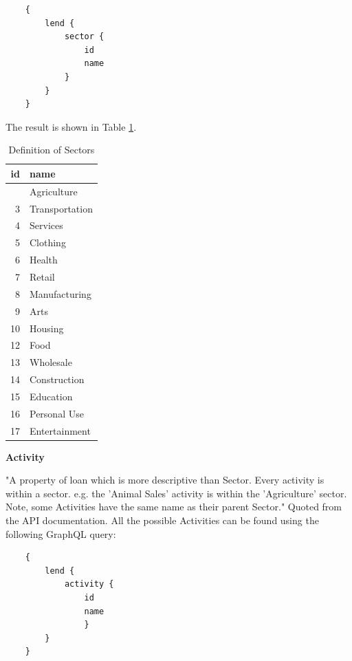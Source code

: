 \begin{lstlisting}
    {
        lend {
            sector {
                id
                name
            }
        }
    }
\end{lstlisting}

The result is shown in Table \ref{tab:sector-definition}.

\begin{longtable}[]{@{}rl@{}}
	\caption{Definition of Sectors}
	\label{tab:sector-definition} \\
	\toprule\noalign{}
	id & name                     \\
	\midrule\noalign{}
	\endhead
	\bottomrule\noalign{}
	\endlastfoot
	1  & Agriculture              \\
	3  & Transportation           \\
	4  & Services                 \\
	5  & Clothing                 \\
	6  & Health                   \\
	7  & Retail                   \\
	8  & Manufacturing            \\
	9  & Arts                     \\
	10 & Housing                  \\
	12 & Food                     \\
	13 & Wholesale                \\
	14 & Construction             \\
	15 & Education                \\
	16 & Personal Use             \\
	17 & Entertainment            \\
\end{longtable}

\textbf{Activity}

"A property of loan which is more descriptive than Sector.
Every activity is within a sector. e.g. the 'Animal Sales' activity is within the 'Agriculture' sector.
Note, some Activities have the same name as their parent Sector."
Quoted from the API documentation.
All the possible Activities can be found using the following GraphQL query:

\begin{lstlisting}
    {
        lend {
            activity {
                id
                name
                }	
        }
    }
\end{lstlisting}


